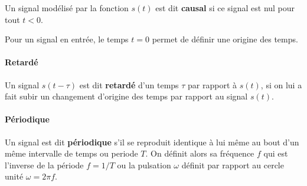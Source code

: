 Un signal modélisé par la fonction $s(t)$ est dit \textbf{causal}
si ce signal est nul pour tout $t<0$. 
{
\begin{figure}[htb]
\centering
{}

\end{figure}
\setlength\intextsep{0pt}
}
Pour un signal en entrée, le temps $t=0$ permet de 
définir une origine des temps.

%

%

%

\paragraph{Retardé}
Un signal $s(t-\tau)$ est dit \textbf{retardé} d'un temps $\tau$ 
par rapport à $s(t)$, si on lui a fait subir un changement
d'origine des temps par rapport au signal $s(t)$.
\begin{center}

\end{center}

\paragraph{Périodique}
                                                                                                                              
Un signal est dit \textbf{périodique} s'il se reproduit identique à lui
même au bout d'un même intervalle de temps ou periode $T$. On définit alors sa fréquence $f$
qui est l'inverse de la période $f=1/T$ ou la pulsation $\omega$ définit par rapport au cercle unité
$\omega=2\pi f$.
{
\begin{figure}[!htb]
\centering
{}

\end{figure}
\setlength\intextsep{0pt}
}
                                                                                                                              
